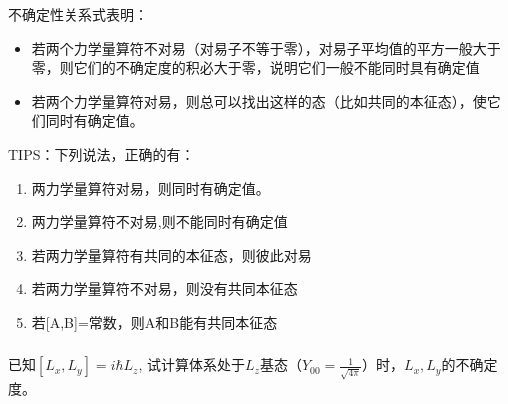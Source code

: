 \begin{frame} [allowframebreaks=]
    \begin{tcolorbox2}{不确定性关系式表明：}
    \begin{itemize}
        \item 若两个力学量算符不对易（对易子不等于零），对易子平均值的平方一般大于零，则它们的不确定度的积必大于零，说明它们一般不能同时具有确定值
        \item 若两个力学量算符对易，则总可以找出这样的态（比如共同的本征态），使它们同时有确定值。 
    \end{itemize}   
    \end{tcolorbox2}
\end{frame} 

\begin{frame} [allowframebreaks=]
    TIPS：下列说法，正确的有：
    \begin{enumerate}
        \item 两力学量算符对易，则同时有确定值。 
        \item 两力学量算符不对易,则不能同时有确定值 
        \item 若两力学量算符有共同的本征态，则彼此对易
        \item 若两力学量算符不对易，则没有共同本征态
        \item 若[A,B]=常数，则A和B能有共同本征态
    \end{enumerate} 
\end{frame} 

\begin{frame} [allowframebreaks=]
    \frametitle{}
    \begin{tcolorbox}[colback=yellow!5,colframe=yellow!75!black,title=课堂作业]
    已知$[L_x, L_y]=i\hbar L_z$, 试计算体系处于$L_z$基态（$Y_{00}=\frac{1}{\sqrt{4\pi}}$）时，$L_x, L_y$的不确定度。
    \end{tcolorbox}
\end{frame} 

